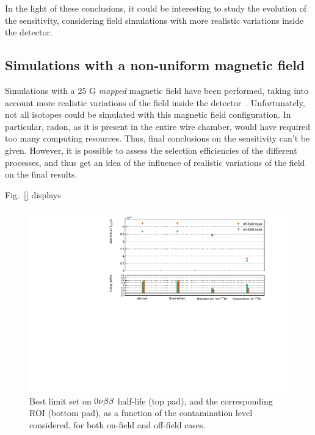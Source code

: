 In the light of these conclusions, it could be interesting to study the evolution of the sensitivity, considering field simulations with more realistic variations inside the detector.


\subsection{Simulations with a non-uniform magnetic field}
\label{subsec:mapped_field}

Simulations with a $25$ G \emph{mapped} magnetic field have been performed, taking into account more realistic variations of the field inside the detector~\cite{docdb:map_magnetic_field2015}.
Unfortunately, not all isotopes could be simulated with this magnetic field configuration.
In particular, radon, as it is present in the entire wire chamber, would have required too many computing resources.
Thus, final conclusions on the sensitivity can't be given.
However, it is possible to assess the selection efficiencies of the different processes, and thus get an idea of the influence of realistic variations of the field on the final results.

Fig.~\ref{} displays
\begin{figure}[h]
  \centering
  \includegraphics[width=1.1\textwidth]{Sensitivity/fig_sensitivity/contamination_Se_w_woB.pdf}
  \caption{Best limit set on $0\nu\beta\beta$ half-life (top pad), and the corresponding ROI (bottom pad), as a function of the contamination level considered, for both on-field and off-field cases.
    \label{fig:}}
\end{figure}

